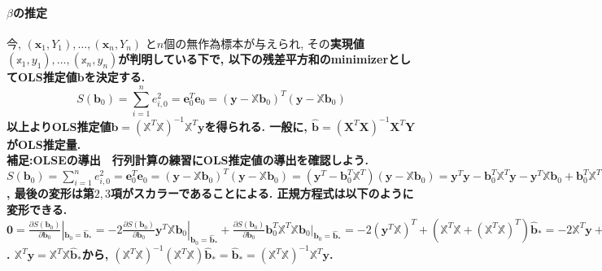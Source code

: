 \documentclass[paper=a4paper,fontsize=10pt]{jlreq}
\begin{document}
\paragraph{$\beta$の推定}
今, $(\mathbf{x}_{1}, Y_1), \dots, (\mathbf{x}_{n}, Y_n)$ と$n$個の無作為標本が与えられ, その\rmfamily\mcfamily\bfseries{実現値}\mdseries$(\mathbb{x}_{1}, y_1), \dots, (\mathbb{x}_{n}, y_n)$が判明している下で, 以下の残差平方和のminimizerとしてOLS推定値$\mathbf{b}$を決定する.
\begin{equation*}
  S(\mathbf{b}_{0})=\sum_{i = 1}^{n} e_{i,0}^{2}=\mathbf{e}_{0}^{T}\mathbf{e}_{0}=(\mathbf{y}-\mathbb{X}\mathbf{b}_{0})^{T}(\mathbf{y}-\mathbb{X}\mathbf{b}_{0})
\end{equation*}
以上よりOLS推定値$\mathbf{b}=(\mathbb{X}^{T}\mathbb{X})^{-1}\mathbb{X}^{T}\mathbf{y}$を得られる. 一般に, $\hat{\mathbf{b}}=(\mathbf{X}^{T}\mathbf{X})^{-1}\mathbf{X}^{T}\mathbf{Y}$がOLS推定量.\\

\rmfamily\mcfamily\bfseries{補足:OLSEの導出}\mdseries　行列計算の練習にOLS推定値の導出を確認しよう. $S(\mathbf{b}_{0})=\sum_{i = 1}^{n} e_{i,0}^{2}=\mathbf{e}_{0}^{T}\mathbf{e}_{0}=(\mathbf{y}-\mathbb{X}\mathbf{b}_{0})^{T}(\mathbf{y}-\mathbb{X}\mathbf{b}_{0})=(\mathbf{y}^{T}-\mathbf{b}_{0}^{T}\mathbb{X}^{T})(\mathbf{y}-\mathbb{X}\mathbf{b}_{0})=\mathbf{y}^{T}\mathbf{y}-\mathbf{b}_{0}^{T}\mathbb{X}^{T}\mathbf{y}-\mathbf{y}^{T}\mathbb{X}\mathbf{b}_{0}+\mathbf{b}_{0}^{T}\mathbb{X}^{T}\mathbb{X}\mathbf{b}_{0}=\mathbf{y}^{T}\mathbf{y}-2\mathbf{y}^{T}\mathbb{X}\mathbf{b}_{0}+\mathbf{b}_{0}^{T}\mathbb{X}^{T}\mathbb{X}\mathbf{b}_{0}$, 最後の変形は第$2, 3$項がスカラーであることによる. 正規方程式は以下のように変形できる. $\mathbf{0}=\frac{\partial S(\mathbf{b}_{0})}{\partial\mathbf{b}_0}|_{\mathbf{b}_0=\hat{\mathbf{b}}_*}=-2\frac{\partial S(\mathbf{b}_{0})}{\partial\mathbf{b}_0}\mathbf{y}^{T}\mathbb{X}\mathbf{b}_{0}|_{\mathbf{b}_0=\hat{\mathbf{b}}_*}+\frac{\partial S(\mathbf{b}_{0})}{\partial\mathbf{b}_0}\mathbf{b}_{0}^{T}\mathbb{X}^{T}\mathbb{X}\mathbf{b}_{0}|_{\mathbf{b}_0=\hat{\mathbf{b}}_*}=-2(\mathbf{y}^{T}\mathbb{X})^{T}+(\mathbb{X}^{T}\mathbb{X}+(\mathbb{X}^{T}\mathbb{X})^{T})\hat{\mathbf{b}}_*=-2\mathbb{X}^{T}\mathbf{y}+2\mathbb{X}^{T}\mathbb{X}\hat{\mathbf{b}}_*$. $\mathbb{X}^{T}\mathbf{y}=\mathbb{X}^{T}\mathbb{X}\hat{\mathbf{b}}_*$から, $(\mathbb{X}^{T}\mathbb{X})^{-1}(\mathbb{X}^{T}\mathbb{X})\hat{\mathbf{b}}_*=\hat{\mathbf{b}}_*=(\mathbb{X}^{T}\mathbb{X})^{-1}\mathbb{X}^{T}\mathbf{y}$.\\
\end{document}
